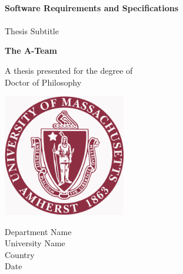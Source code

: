 \begin{titlepage}
    \begin{center}
        \vspace*{1cm}
        
 
        \HRule \\[0.4cm]
        {   \huge\textbf{Software Requirements and Specifications}\\[0.4cm] }
        \HRule \\[1cm]
       
        
        \vspace{0.5cm}
        \LARGE
        Thesis Subtitle
        
        \vspace{1.5cm}
        
        \textbf{The A-Team}
        
        \vfill
        
        A thesis presented for the degree of\\
        Doctor of Philosophy
        
        \vspace{0.8cm}
        
        \includegraphics[width=0.4\textwidth]{UMASS_logo}
        
        \Large
        Department Name\\
        University Name\\
        Country\\
        Date
        
    \end{center}
\end{titlepage}